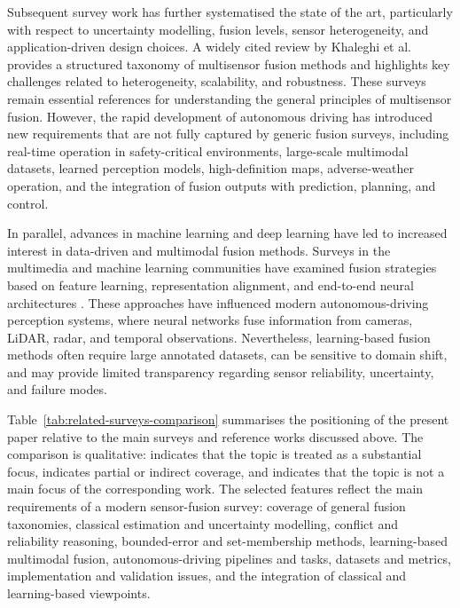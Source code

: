 \documentclass{ieeeaccess}
\newcommand{\cmark}{\textcolor{ForestGreen}{\ding{51}}}
\newcommand{\pmark}{\textcolor{Orange}{\ding{108}}}
\newcommand{\xmark}{\textcolor{red}{\ding{55}}}
\begin{document}
Subsequent survey work has further systematised the state of the art, particularly with respect to uncertainty modelling, fusion levels, sensor heterogeneity, and application-driven design choices. A widely cited review by Khaleghi et al. \cite{khaleghi_multisensor_2013} provides a structured taxonomy of multisensor fusion methods and highlights key challenges related to heterogeneity, scalability, and robustness. These surveys remain essential references for understanding the general principles of multisensor fusion. However, the rapid development of autonomous driving has introduced new requirements that are not fully captured by generic fusion surveys, including real-time operation in safety-critical environments, large-scale multimodal datasets, learned perception models, high-definition maps, adverse-weather operation, and the integration of fusion outputs with prediction, planning, and control.

In parallel, advances in machine learning and deep learning have led to increased interest in data-driven and multimodal fusion methods. Surveys in the multimedia and machine learning communities have examined fusion strategies based on feature learning, representation alignment, and end-to-end neural architectures \cite{atrey_multimodal_2010, baltrusaitis_multimodal_2019}. These approaches have influenced modern autonomous-driving perception systems, where neural networks fuse information from cameras, LiDAR, radar, and temporal observations. Nevertheless, learning-based fusion methods often require large annotated datasets, can be sensitive to domain shift, and may provide limited transparency regarding sensor reliability, uncertainty, and failure modes.

Table~\ref{tab:related-surveys-comparison} summarises the positioning of the present paper relative to the main surveys and reference works discussed above. The comparison is qualitative: \cmark{} indicates that the topic is treated as a substantial focus, \pmark{} indicates partial or indirect coverage, and \xmark{} indicates that the topic is not a main focus of the corresponding work. The selected features reflect the main requirements of a modern sensor-fusion survey: coverage of general fusion taxonomies, classical estimation and uncertainty modelling, conflict and reliability reasoning, bounded-error and set-membership methods, learning-based multimodal fusion, autonomous-driving pipelines and tasks, datasets and metrics, implementation and validation issues, and the integration of classical and learning-based viewpoints.
\end{document}
